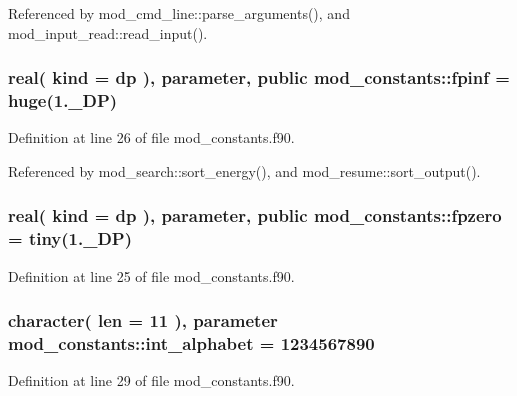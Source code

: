Referenced by mod\+\_\+cmd\+\_\+line\+::parse\+\_\+arguments(), and mod\+\_\+input\+\_\+read\+::read\+\_\+input().

\subsubsection[{\texorpdfstring{fpinf}{fpinf}}]{\setlength{\rightskip}{0pt plus 5cm}real( kind = {\bf dp} ), parameter, public mod\+\_\+constants\+::fpinf = huge(1.\+\_\+\+D\+P)}\hypertarget{namespacemod__constants_a64820d61363b4adcee8f4f810662e836}{}\label{namespacemod__constants_a64820d61363b4adcee8f4f810662e836}


Definition at line 26 of file mod\+\_\+constants.\+f90.



Referenced by mod\+\_\+search\+::sort\+\_\+energy(), and mod\+\_\+resume\+::sort\+\_\+output().

\subsubsection[{\texorpdfstring{fpzero}{fpzero}}]{\setlength{\rightskip}{0pt plus 5cm}real( kind = {\bf dp} ), parameter, public mod\+\_\+constants\+::fpzero = tiny(1.\+\_\+\+D\+P)}\hypertarget{namespacemod__constants_a1f06c759fc8a61d66f343865300c37d1}{}\label{namespacemod__constants_a1f06c759fc8a61d66f343865300c37d1}


Definition at line 25 of file mod\+\_\+constants.\+f90.

\subsubsection[{\texorpdfstring{int\+\_\+alphabet}{int_alphabet}}]{\setlength{\rightskip}{0pt plus 5cm}character( len = 11 ), parameter mod\+\_\+constants\+::int\+\_\+alphabet = \textquotesingle{}1234567890\textquotesingle{}}\hypertarget{namespacemod__constants_a41cb897f7d31e58ab3c2b2f7ecf86983}{}\label{namespacemod__constants_a41cb897f7d31e58ab3c2b2f7ecf86983}


Definition at line 29 of file mod\+\_\+constants.\+f90.



